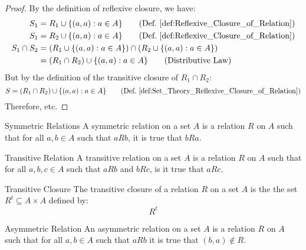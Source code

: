         \begin{proof}
            By the definition of reflexive closure, we have:
            \begin{align}
                S_{1}&=R_{1}\cup\{(a,a):a\in{A}\}
                \tag{Def.~\ref{def:Reflexive_Closure_of_Relation}}\\
                S_{1}&=R_{2}\cup\{(a,a):a\in{A}\}
                \tag{Def.~\ref{def:Reflexive_Closure_of_Relation}}\\
                \nonumber
                S_{1}\cap{S}_{2}&=
                (R_{1}\cup\{(a,a):a\in{A}\})
                \cap(R_{2}\cup\{(a,a):a\in{A}\})\\
                &=(R_{1}\cap{R}_{2})
                \cup\{(a,a):a\in{A}\}
                \tag{Distributive Law}
            \end{align}
            But by the definition of the transitive closure of
            $R_{1}\cap{R}_{2}$:
            \begin{equation}
                S=(R_{1}\cap{R}_{2})\cup\{(a,a):a\in{A}\}
                \tag{Def.~\ref{def:Set_Theory_Reflexive_%
                               Closure_of_Relation}}
            \end{equation}
            Therefore, etc.
        \end{proof}
        \begin{ldefinition}{Symmetric Relations}
            A symmetric relation on a set $A$ is a
            relation $R$ on $A$ such that for all $a,b\in{A}$
            such that $aRb$, it is true that $bRa$.
        \end{ldefinition}
        \begin{ldefinition}{Transitive Relation}
            A transitive relation on a set $A$ is a relation $R$ on $A$
            such that for all $a,b,c\in{A}$ such that $aRb$ and $bRc$,
            is it true that $aRc$.
        \end{ldefinition}
        \begin{ldefinition}{Transitive Closure}
            The transitive closure of a relation $R$ on a set
            $A$ is the the set $R^{t}\subseteq{A}\times{A}$ defined by:
            \begin{equation}
                R^{t}
            \end{equation}
        \end{ldefinition}
        \begin{ldefinition}{Asymmetric Relation}
            An asymmetric relation on a set $A$ is a relation $R$
            on $A$ such that for all $a,b\in{A}$ such that $aRb$
            it is true that $(b,a)\notin{R}$.
        \end{ldefinition}
